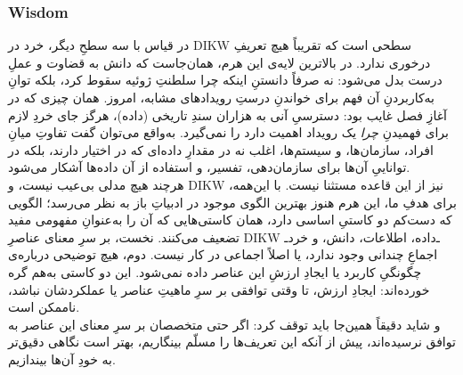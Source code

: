 \subsubsection{Wisdom}
در قیاس با سه سطحِ دیگر، خرد در DIKW سطحی است که تقریباً هیچ تعریفِ درخوری ندارد. در بالاترین لایه‌ی این هرم، همان‌جاست که دانش به قضاوت و عملِ درست بدل می‌شود: نه صرفاً دانستنِ اینکه چرا سلطنتِ ژوئیه سقوط کرد، بلکه توانِ به‌کاربردنِ آن فهم برای خواندنِ درستِ رویدادهای مشابه، امروز. همان چیزی که در آغازِ فصل غایب بود: دسترسیِ آنی به هزاران سندِ تاریخی (داده)، هرگز جای خردِ لازم برای فهمیدنِ \emph{چرا} یک رویداد اهمیت دارد را نمی‌گیرد. به‌واقع می‌توان گفت تفاوتِ میانِ افراد، سازمان‌ها، و سیستم‌ها، اغلب نه در مقدارِ داده‌ای که در اختیار دارند، بلکه در تواناییِ آن‌ها برای سازمان‌دهی، تفسیر، و استفاده از آن داده‌ها آشکار می‌شود.\\
هرچند هیچ مدلی بی‌عیب نیست، و DIKW نیز از این قاعده مستثنا نیست. با این‌همه، برای هدفِ ما، این هرم هنوز بهترین الگوی موجود در ادبیاتِ باز به نظر می‌رسد؛ الگویی که دست‌کم دو کاستیِ اساسی دارد، همان کاستی‌هایی که آن را به‌عنوانِ مفهومی مفید تضعیف می‌کنند. نخست، بر سرِ معنای عناصرِ DIKW ـ‌داده، اطلاعات، دانش، و خرد‌ـ اجماعِ چندانی وجود ندارد، یا اصلاً اجماعی در کار نیست. دوم، هیچ توضیحی درباره‌ی چگونگیِ کاربرد یا ایجادِ ارزشِ این عناصر داده نمی‌شود. این دو کاستی به‌هم گره خورده‌اند: ایجادِ ارزش، تا وقتی توافقی بر سرِ ماهیتِ عناصر یا عملکردشان نباشد، ناممکن است.\\
و شاید دقیقاً همین‌جا باید توقف کرد: اگر حتی متخصصان بر سرِ معنای این عناصر به توافق نرسیده‌اند، پیش از آنکه این تعریف‌ها را مسلّم بینگاریم، بهتر است نگاهی دقیق‌تر به خودِ آن‌ها بیندازیم.
\newpage
